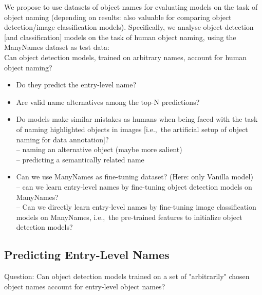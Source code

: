 \documentclass[11pt,a4paper]{article}
\newcommand{\mn}{ManyNames\xspace}
\begin{document}
We propose to use datasets of object names for evaluating models on the task of object naming (depending on results: also valuable for comparing object detection/image classification models).
Specifically, we analyse object detection [and classification] models on the task of human object naming, using the \mn dataset as test data:\\
Can object detection models, trained on arbitrary names, account for human object naming?
\begin{itemize}
	\item Do they predict the entry-level name?
	\item Are valid name alternatives among the top-N predictions?
	\item Do models make similar mistakes as humans when being faced with the task of naming highlighted objects in images [i.e.,\ the artificial setup of object naming for data annotation]?\\
	-- naming an alternative object (maybe more salient)\\
	-- predicting a semantically related name
	\item Can we use \mn as fine-tuning dataset? (Here: only Vanilla model)\\
	-- can we learn entry-level names by fine-tuning object detection models on \mn?\\
	-- Can we directly learn entry-level names by fine-tuning image classification models on \mn, i.e.,\ the pre-trained features to initialize object detection models?
\end{itemize}



\subsection{Predicting Entry-Level Names}
\label{sect:exp_entry}
Question: Can object detection models trained on a set of "arbitrarily" chosen object names account for entry-level object names? 
\end{document}
